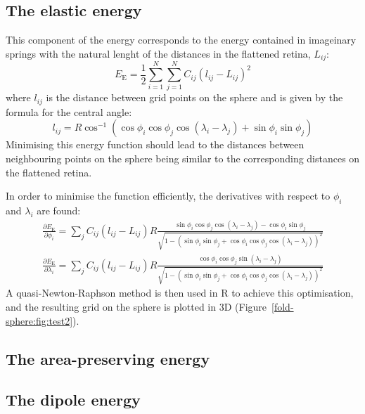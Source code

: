 \documentclass{article}
\newcommand{\EE}{\ensuremath{E_\mathrm{E}}\xspace}
\begin{document}
\subsection{The elastic energy}
\label{fold-sphere:sec:elastic-force}

This component of the energy corresponds to the energy contained in
imageinary springs with the natural lenght of the distances in the
flattened retina, $L_{ij}$:
\begin{equation}
  \label{fold-sphere:eq:5}
  \EE  = \frac{1}{2} \sum_{i=1}^N \sum_{j=1}^N C_{ij} (l_{ij}-L_{ij})^2  
\end{equation}
where $l_{ij}$ is the distance between grid points on the sphere and
is given by the formula for the central angle:
\begin{equation}
  \label{fold-sphere:eq:2}
  l_{ij} = R\cos^{-1}(\cos\phi_i\cos\phi_j\cos(\lambda_i-\lambda_j) + \sin\phi_i\sin\phi_j)
\end{equation}
Minimising this energy function should lead to the distances between
neighbouring points on the sphere being similar to the corresponding
distances on the flattened retina.

In order to minimise the function efficiently, the derivatives with
respect to $\phi_i$ and $\lambda_i$ are found:
\begin{equation}
  \label{fold-sphere:eq:3}
  \begin{split}
    \frac{\partial \EE}{\partial\phi_i} = 
    \sum_j C_{ij} (l_{ij} - L_{ij})R
    \frac{\sin\phi_i\cos\phi_j\cos(\lambda_i-\lambda_j) - \cos\phi_i\sin\phi_j}
    {\sqrt{1-(\sin\phi_i\sin\phi_j +
        \cos\phi_i\cos\phi_j\cos(\lambda_i-\lambda_j))^2}} \\
    \frac{\partial \EE}{\partial\lambda_i} = 
    \sum_j C_{ij} (l_{ij} - L_{ij})R
    \frac{\cos\phi_i\cos\phi_j\sin(\lambda_i-\lambda_j)}
    {\sqrt{1-(\sin\phi_i\sin\phi_j + \cos\phi_i\cos\phi_j\cos(\lambda_i-\lambda_j))^2}}
  \end{split}
\end{equation}
A quasi-Newton-Raphson method is then used in R to achieve this
optimisation, and the resulting grid on the sphere is plotted in 3D
(Figure~\ref{fold-sphere:fig:test2}).

\subsection{The area-preserving energy}
\label{fold-sphere:sec:area-pres-energy}

\subsection{The dipole energy}
\label{fold-sphere:sec:dipole-energy}
\end{document}
